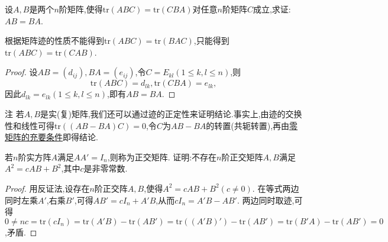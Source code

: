 \documentclass[../../main.tex]{subfiles}
\begin{document}
\begin{proposition}\label{proposition:矩阵可交换关于迹的充分条件}
设\(A,B\)是两个\(n\)阶矩阵,使得\(\mathrm{tr}(ABC)=\mathrm{tr}(CBA)\)对任意\(n\)阶矩阵\(C\)成立,求证:\(AB = BA\).
\end{proposition}
\begin{remark}
根据矩阵迹的性质不能得到$\mathrm{tr}(ABC)=\mathrm{tr}(BAC)$,只能得到$\mathrm{tr}(ABC)=\mathrm{tr}(CAB)$.
\end{remark}
\begin{proof}
设\(AB=(d_{ij}),BA=(e_{ij})\),令\(C = E_{kl}(1\leqslant  k,l\leqslant  n)\),则
\[
\mathrm{tr}(ABC)=d_{lk},\mathrm{tr}(CBA)=e_{lk},
\]
因此\(d_{lk}=e_{lk}(1\leqslant  k,l\leqslant  n)\),即有\(AB = BA\).

\end{proof}
\begin{remark}
注 若\(A,B\)是实(复)矩阵,我们还可以通过迹的正定性来证明结论.事实上,由迹的交换性和线性可得\(\mathrm{tr}((AB - BA)C)=0\),令\(C\)为\(AB - BA\)的转置(共轭转置),再由\hyperref[proposition:零矩阵的充要条件]{零矩阵的充要条件}即得结论.
\end{remark}

\begin{example}
若\(n\)阶实方阵\(A\)满足\(AA' = I_n\),则称为正交矩阵. 证明:不存在\(n\)阶正交矩阵\(A,B\)满足\(A^2 = cAB + B^2\),其中\(c\)是非零常数.
\end{example}
\begin{proof}
用反证法,设存在\(n\)阶正交阵\(A,B\),使得\(A^2 = cAB + B^2(c\neq0)\). 在等式两边同时左乘\(A'\),右乘\(B'\),可得\(AB' = cI_n + A'B\),从而\(cI_n = A'B - AB'\). 两边同时取迹,可得\(0\ne nc=\text{tr}(cI_n)=\text{tr}(A'B)-\text{tr}(AB')=\text{tr}((A'B)') - \text{tr}(AB')=\text{tr}(B'A)-\text{tr}(AB') = 0\),矛盾.

\end{proof}
\end{document}
